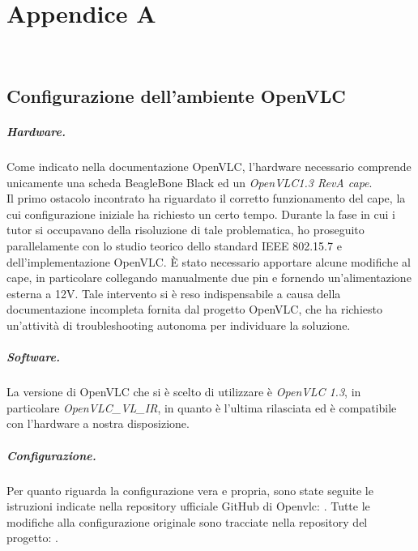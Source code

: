 \chapter{Appendice A}
\label{app:A}

\\

\section{Configurazione dell'ambiente OpenVLC}

\paragraph{Hardware.} Come indicato nella documentazione OpenVLC, l'hardware necessario comprende unicamente una scheda BeagleBone Black ed un \textit{OpenVLC1.3 RevA cape}.\\
Il primo ostacolo incontrato ha riguardato il corretto funzionamento del cape, la cui configurazione iniziale ha richiesto un certo tempo. Durante la fase in cui i tutor si occupavano della risoluzione di tale problematica, ho proseguito parallelamente con lo studio teorico dello standard IEEE 802.15.7 e dell'implementazione OpenVLC. È stato necessario apportare alcune modifiche al cape, in particolare collegando manualmente due pin e fornendo un'alimentazione esterna a 12V. Tale intervento si è reso indispensabile a causa della documentazione incompleta fornita dal progetto OpenVLC, che ha richiesto un'attività di troubleshooting autonoma per individuare la soluzione.
\paragraph{Software.} La versione di OpenVLC che si è scelto di utilizzare è \textit{OpenVLC 1.3}, in particolare \textit{OpenVLC\_VL\_IR}, in quanto è l'ultima rilasciata ed è compatibile con l'hardware a nostra disposizione.

\paragraph{Configurazione.} Per quanto riguarda la configurazione vera e propria, sono state seguite le istruzioni indicate nella repository ufficiale GitHub di Openvlc: \cite{site:openvlc-github}. Tutte le modifiche alla configurazione originale sono tracciate nella repository del progetto: \cite{site:openvlc-pa-github}.

